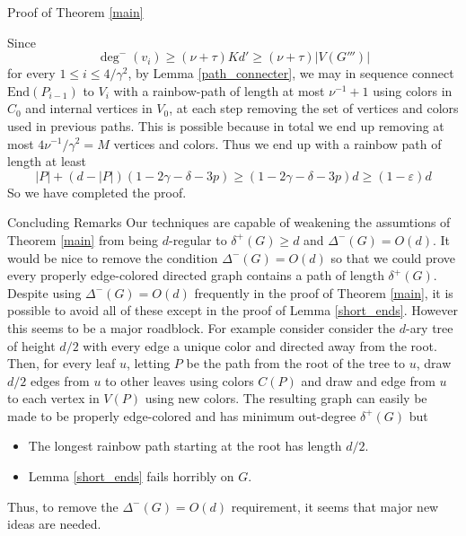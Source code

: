 \documentclass[11pt,a4paper]{article}
\newcommand{\vep}{\varepsilon}
\newcommand{\End}{\mathrm{End}}
\begin{document}
\begin{section}{Proof of Theorem \ref{main}}
\medskip

Since
	\[
	\deg^{-} (v_i) \geq (\nu + \tau) K d' \geq  (\nu + \tau) |V(G''')|
	\]
for every $1 \leq i \leq 4/\gamma^2$, by Lemma \ref{path_connecter}, we may in sequence connect $\End(P_{i - 1})$ to $V_i$ with a rainbow-path of length at most $\nu^{-1} + 1$ using colors in $C_0$ and internal vertices in $V_0$, at each step removing the set of vertices and colors used in previous paths. This is possible because in total we end up removing at most $4\nu^{-1}/\gamma^2 = M$ vertices and colors. Thus we end up with a rainbow path of length at least
	\[
	|P| + (d - |P|) (1 - 2 \gamma - \delta - 3p) \geq (1 - 2 \gamma - \delta -3p) d \geq (1 - \vep) d
	\]
So we have completed the proof.
\end{section}
\begin{section}{Concluding Remarks}
Our techniques are capable of weakening the assumtions of Theorem \ref{main} from being $d$-regular to $\delta^+(G) \geq d$ and $\Delta^-(G) = O(d)$. It would be nice to remove the condition $\Delta^-(G) = O(d)$ so that we could prove every properly edge-colored directed graph contains a path of length $\delta^+(G)$. Despite using $\Delta^-(G) = O(d)$ frequently in the proof of Theorem \ref{main}, it is possible to avoid all of these except in the proof of Lemma \ref{short_ends}. However this seems to be a major roadblock. For example consider consider the $d$-ary tree of height $d/2$ with every edge a unique color and directed away from the root. Then, for every leaf $u$, letting $P$ be the path from the root of the tree to $u$, draw $d/2$ edges from $u$ to other leaves using colors $C(P)$ and draw and edge from $u$ to each vertex in $V(P)$ using new colors. The resulting graph can easily be made to be properly edge-colored and has minimum out-degree $\delta^+(G)$ but
\begin{itemize}
\item The longest rainbow path starting at the root has length $d/2$.
\item Lemma \ref{short_ends} fails horribly on $G$.
\end{itemize}
Thus, to remove the $\Delta^-(G) = O(d)$ requirement, it seems that major new ideas are needed.
\end{section}
\end{document}
